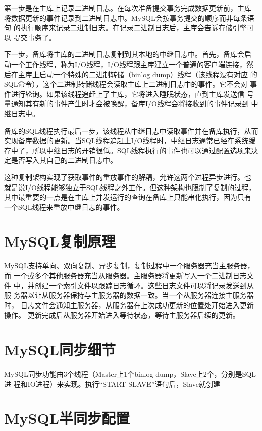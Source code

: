 第一步是在主库上记录二进制日志。在每次准备提交事务完成数据更新前，主库
将数据更新的事件记录到二进制日志中。MySQL会按事务提交的顺序而非每条语句
的执行顺序来记录二进制日志。在记录二进制日志后，主库会告诉存储引擎可以
提交事务了。

下一步，备库将主库的二进制日志复制到其本地的中继日志中。首先，备库会启
动一个工作线程，称为I/O线程，I/O线程跟主库建立一个普通的客户端连接，然
后在主库上启动一个特殊的二进制转储（binlog dump）线程（该线程没有对应
的SQL命令），这个二进制转储线程会读取主库上二进制日志中的事件。它不会对
事件进行轮询。如果该线程追赶上了主库，它将进入睡眠状态，直到主库发送信
号量通知其有新的事件产生时才会被唤醒，备库I/O线程会将接收到的事件记录到
中继日志中。

备库的SQL线程执行最后一步，该线程从中继日志中读取事件并在备库执行，从而
实现备库数据的更新。当SQL线程追赶上I/O线程时，中继日志通常已经在系统缓
存中了，所以中继日志的开销很低。SQL线程执行的事件也可以通过配置选项来决
定是否写入其自己的二进制日志中。

这种复制架构实现了获取事件的重放事件的解耦，允许这两个过程异步进行。也
就是说I/O线程能够独立于SQL线程之外工作。但这种架构也限制了复制的过程，
其中最重要的一点是在主库上并发运行的查询在备库上只能串化执行，因为只有
一个SQL线程来重放中继日志的事件。

\section{MySQL复制原理}

MySQL支持单向、双向复制、异步复制，复制过程中一个服务器充当主服务器，而
一个或多个其他服务器充当从服务器。主服务器将更新写入一个二进制日志文件
中，并创建一个索引文件以跟踪日志循环。这些日志文件可以将记录发送到从服
务器以让从服务器保持与主服务器的数据一致。当一个从服务器连接主服务器时，
日志文件会通知主服务器，从服务器在上次成功更新的位置处开始进入更新操作。
更新完成后从服务器开始进入等待状态，等待主服务器后续的更新。

\section{MySQL同步细节}

MySQL同步功能由3个线程（Master上1个binlog dump，Slave上2个，分别是SQL进
程和IO进程）来实现。执行“START SLAVE”语句后，Slave就创建

\section{MySQL半同步配置}

